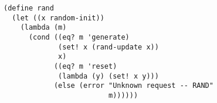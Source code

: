 \documentclass[a4paper,12pt]{article}
\begin{document}
\begin{lstlisting}
(define rand
  (let ((x random-init))
    (lambda (m)
      (cond ((eq? m 'generate)
             (set! x (rand-update x))
             x)
            ((eq? m 'reset)
             (lambda (y) (set! x y)))
            (else (error "Unknown request -- RAND"
                         m))))))
\end{lstlisting}
\end{document}
